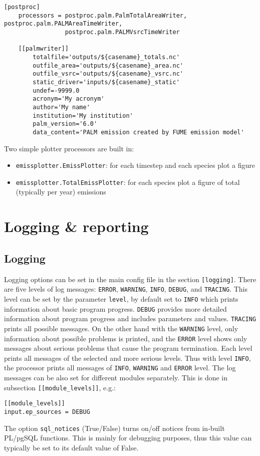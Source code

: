 \documentclass[a4paper,11pt]{article}
\begin{document}
\begin{verbatim}
[postproc]
    processors = postproc.palm.PalmTotalAreaWriter, postproc.palm.PALMAreaTimeWriter,
                 postproc.palm.PALMVsrcTimeWriter
    
    [[palmwriter]]
        totalfile='outputs/${casename}_totals.nc'
        outfile_area='outputs/${casename}_area.nc'
        outfile_vsrc='outputs/${casename}_vsrc.nc'
        static_driver='inputs/${casename}_static'
        undef=-9999.0
        acronym='My acronym'
        author='My name'
        institution='My institution'
        palm_version='6.0'
        data_content='PALM emission created by FUME emission model'
\end{verbatim}


Two simple plotter processors are built in:

\begin{itemize}
\item
  \verb|emissplotter.EmissPlotter|: for each timestep and each species plot a
  figure
\item
  \verb|emissplotter.TotalEmissPlotter|: for each species plot a figure of
  total (typically per year) emissions
\end{itemize}

\section{Logging \& reporting}
\subsection{Logging}\label{logging}
Logging options can be set in the main config file in the section \verb|[logging]|. There are five levels of log messages: \verb|ERROR|, \verb|WARNING|, \verb|INFO|, \verb|DEBUG|, and \verb|TRACING|. This level can be set by the parameter \verb|level|, by default set to \verb|INFO| which prints information about basic program progress. \verb|DEBUG| provides more detailed information about program progress and includes parameters and values. \verb|TRACING| prints all possible messages. On the other hand with the \verb|WARNING| level, only information about possible problems is printed, and the \verb|ERROR| level shows only messages about serious problems that cause the program termination. Each level prints all messages of the selected and more serious levels. Thus with level \verb|INFO|, the processor prints all messages of \verb|INFO|, \verb|WARNING| and \verb|ERROR| level. The log messages can be also set for different modules separately. This is done in subsection \verb|[[module_levels]]|, e.g.:
\begin{verbatim}
[[module_levels]]
input.ep_sources = DEBUG
\end{verbatim}
The option \verb|sql_notices| (True/False) turns on/off notices from in-built PL/pgSQL functions. This is mainly for debugging purposes, thus this value can typically be set to its default value of False. 
\end{document}
